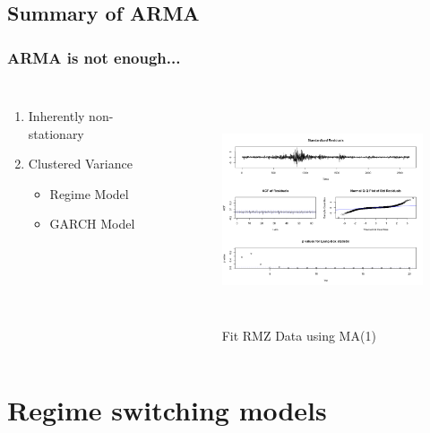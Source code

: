 \documentclass{beamer}
\newcommand\Fontviii{\fontsize{8}{9.2}\selectfont}
\begin{document}
\subsection{Summary of ARMA}
\begin{frame}
\frametitle{ARMA is not enough...}
\Fontviii
\begin{columns}[c]
\begin{enumerate}
\item Inherently non-stationary
\item Clustered Variance
\begin{itemize}
\item Regime Model
\item GARCH Model
\end{itemize}
\end{enumerate}

\begin{figure}[h]
\centering 
\includegraphics[width=6cm,height = 6cm]{../results/DiagnosticRMZ}
\label{fig: dailyReturns}
\caption{Fit RMZ Data using MA(1)}
\end{figure}

\end{columns}
\end{frame}

\section{Regime switching models}
\end{document}
